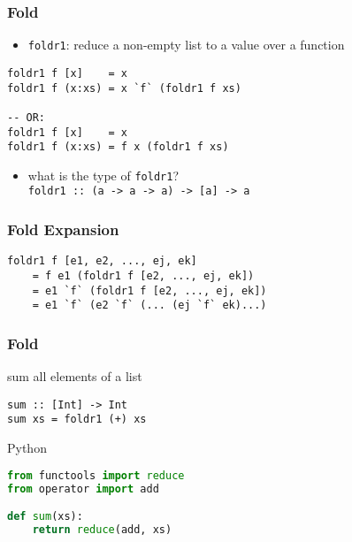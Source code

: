 \documentclass[dvipsnames]{beamer}
\theoremstyle{plain}
\begin{document}
\begin{frame}[fragile]
  \frametitle{Fold}

  \begin{itemize}
    \item \lstinline|foldr1|: reduce a non-empty list to a value over a function
  \end{itemize}

  \begin{exampleblock}{}
    \begin{lstlisting}[deletekeywords={foldr1}]
foldr1 f [x]    = x
foldr1 f (x:xs) = x `f` (foldr1 f xs)

-- OR:
foldr1 f [x]    = x
foldr1 f (x:xs) = f x (foldr1 f xs)
    \end{lstlisting}
  \end{exampleblock}

  \pause
  \begin{itemize}
    \item what is the type of \lstinline|foldr1|?\\
      \lstinline|foldr1 :: (a -> a -> a) -> [a] -> a|
  \end{itemize}
\end{frame}

\begin{frame}[fragile]
  \frametitle{Fold Expansion}

  \begin{block}{}
    \begin{lstlisting}
foldr1 f [e1, e2, ..., ej, ek]
    = f e1 (foldr1 f [e2, ..., ej, ek])
    = e1 `f` (foldr1 f [e2, ..., ej, ek])
    = e1 `f` (e2 `f` (... (ej `f` ek)...)
    \end{lstlisting}
  \end{block}
\end{frame}

\begin{frame}[fragile]
  \frametitle{Fold}

  \begin{exampleblock}{sum all elements of a list}
    \begin{lstlisting}[deletekeywords={sum}]
sum :: [Int] -> Int
sum xs = foldr1 (+) xs
    \end{lstlisting}
  \end{exampleblock}

  \bigskip
  \begin{exampleblock}{Python}
    \begin{lstlisting}[language=Python, deletekeywords={reduce, sum}]
from functools import reduce
from operator import add

def sum(xs):
    return reduce(add, xs)
    \end{lstlisting}
  \end{exampleblock}
\end{frame}
\end{document}
